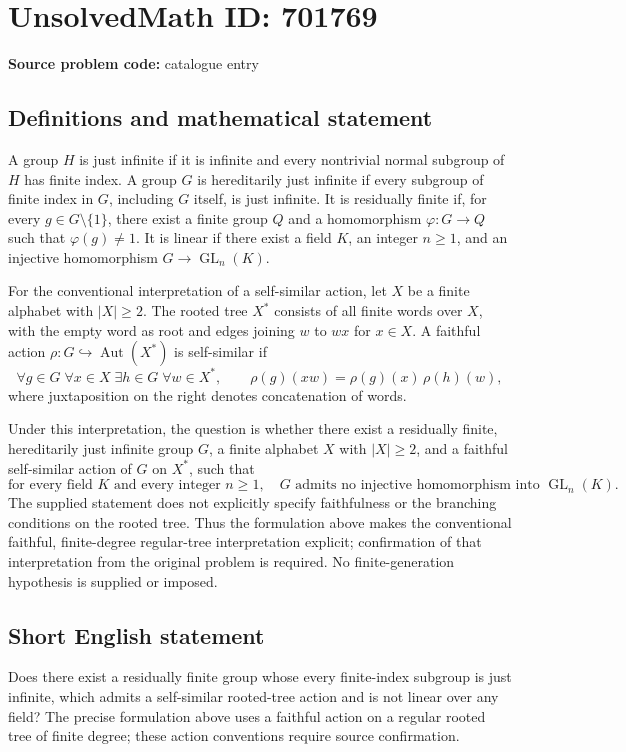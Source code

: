 \documentclass[11pt]{article}
\begin{document}
\section*{UnsolvedMath ID: 701769}
\textbf{Source problem code:} catalogue entry
\subsection{Definitions and mathematical statement}
A group \(H\) is just infinite if it is infinite and every nontrivial normal subgroup of \(H\) has finite index. A group \(G\) is hereditarily just infinite if every subgroup of finite index in \(G\), including \(G\) itself, is just infinite. It is residually finite if, for every \(g\in G\setminus\{1\}\), there exist a finite group \(Q\) and a homomorphism \(\varphi:G\to Q\) such that \(\varphi(g)\ne 1\). It is linear if there exist a field \(K\), an integer \(n\geq 1\), and an injective homomorphism \(G\to\operatorname{GL}_n(K)\).

For the conventional interpretation of a self-similar action, let \(X\) be a finite alphabet with \(|X|\geq 2\). The rooted tree \(X^*\) consists of all finite words over \(X\), with the empty word as root and edges joining \(w\) to \(wx\) for \(x\in X\). A faithful action \(\rho:G\hookrightarrow\operatorname{Aut}(X^*)\) is self-similar if
\[
\forall g\in G\;\forall x\in X\;\exists h\in G\;\forall w\in X^*,\qquad
\rho(g)(xw)=\rho(g)(x)\,\rho(h)(w),
\]
where juxtaposition on the right denotes concatenation of words.

Under this interpretation, the question is whether there exist a residually finite, hereditarily just infinite group \(G\), a finite alphabet \(X\) with \(|X|\geq 2\), and a faithful self-similar action of \(G\) on \(X^*\), such that
\[
\text{for every field }K\text{ and every integer }n\geq 1,
\quad G\text{ admits no injective homomorphism into }\operatorname{GL}_n(K).
\]
The supplied statement does not explicitly specify faithfulness or the branching conditions on the rooted tree. Thus the formulation above makes the conventional faithful, finite-degree regular-tree interpretation explicit; confirmation of that interpretation from the original problem is required. No finite-generation hypothesis is supplied or imposed.
\subsection{Short English statement}
Does there exist a residually finite group whose every finite-index subgroup is just infinite, which admits a self-similar rooted-tree action and is not linear over any field? The precise formulation above uses a faithful action on a regular rooted tree of finite degree; these action conventions require source confirmation.
\end{document}
